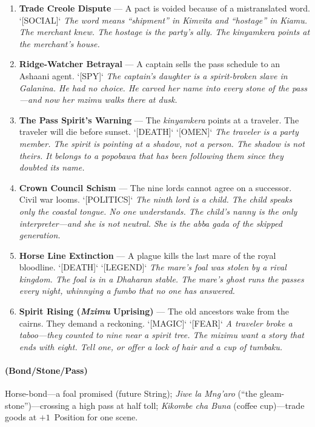 \begin{enumerate}
\item \textbf{Trade Creole Dispute} --- A pact is voided because of a mistranslated word. `[SOCIAL]`
  \hfill \textit{The word means ``shipment'' in \textit{Kimvita} and ``hostage'' in \textit{Kiamu}. The merchant knew. The hostage is the party's ally. The \textit{kinyamkera} points at the merchant's house.}
\item \textbf{Ridge-Watcher Betrayal} --- A captain sells the pass schedule to an Ashaani agent. `[SPY]`
  \hfill \textit{The captain's daughter is a spirit-broken slave in Galanina. He had no choice. He carved her name into every stone of the pass---and now her \textit{mzimu} walks there at dusk.}
\item[J] \textbf{The Pass Spirit's Warning} --- The \textit{kinyamkera} points at a traveler. The traveler will die before sunset. `[DEATH]` `[OMEN]`
  \hfill \textit{The traveler is a party member. The spirit is pointing at a shadow, not a person. The shadow is not theirs. It belongs to a \textit{popobawa} that has been following them since they doubted its name.}
\item[Q] \textbf{Crown Council Schism} --- The nine lords cannot agree on a successor. Civil war looms. `[POLITICS]`
  \hfill \textit{The ninth lord is a child. The child speaks only the coastal tongue. No one understands. The child's nanny is the only interpreter---and she is not neutral. She is the \textit{abba gada} of the skipped generation.}
\item[K] \textbf{Horse Line Extinction} --- A plague kills the last mare of the royal bloodline. `[DEATH]` `[LEGEND]`
  \hfill \textit{The mare's foal was stolen by a rival kingdom. The foal is in a Dhaharan stable. The mare's ghost runs the passes every night, whinnying a \textit{fumbo} that no one has answered.}
\item[A] \textbf{Spirit Rising (\textit{Mzimu} Uprising)} --- The old ancestors wake from the cairns. They demand a reckoning. `[MAGIC]` `[FEAR]`
  \hfill \textit{A traveler broke a taboo---they counted to nine near a spirit tree. The \textit{mizimu} want a story that ends with eight. Tell one, or offer a lock of hair and a cup of \textit{tumbaku}.}
\end{enumerate}

\paragraph*{(Bond/Stone/Pass)} Horse-bond---a foal promised (future String); \textit{Jiwe la Mng'aro} (``the gleam-stone'')---crossing a high pass at half toll; \textit{Kikombe cha Buna} (coffee cup)---trade goods at $+1$~Position for one scene.

